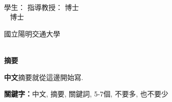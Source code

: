 \begin{center}
    \large
    \begin{singlespace}    
        \textbf{\chineseTitle{}} \\[0.5cm]
    \end{singlespace}

    \begin{singlespace}    
    學生：\studentCnName  \hspace{2.5cm}  指導教授：\advisorCnName \hspace{0.1cm} 博士 \\

    \ifdefined\advisorCnNameB %
        \hspace{9.6cm}  \advisorCnNameB ~ 博士 \\
    \fi
    \end{singlespace}

    \vspace{0.5cm}

    \begin{singlespace}
        國立陽明交通大學\\
        \NameofDepartmentInstituteCN\\[0.2cm]
    \end{singlespace}

    \textbf{摘\hspace{1cm}要} \\[0.5cm]

\end{center}

\normalsize 

\textbf{中文}摘要就從這邊開始寫.

\vspace{1cm}

\textbf{關鍵字：}中文, 摘要, 關鍵詞, 5-7個, 不要多, 也不要少
